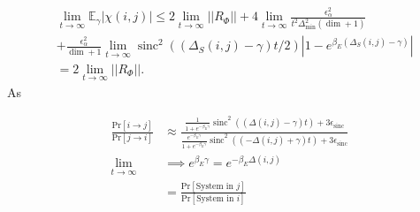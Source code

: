 \documentclass{article}
\newcommand{\abs}[1]{\left| #1 \right|}
\newcommand{\norm}[1]{\left| \left| #1 \right| \right|}
\newcommand{\prob}[1]{\text{Pr}\left[ #1 \right]}
\DeclareMathOperator{\sinc}{sinc}
\begin{document}
\begin{align}
    &\lim_{t \to \infty} \mathbb{E}_{\gamma} \abs{\chi(i,j)} \leq 2 \lim_{t \to \infty} \norm{R_{\Phi}} + 4 \lim_{t \to \infty} \frac{\epsilon_{\alpha}^2}{t^2 \Delta_{\min}^2 (\dim + 1)} \nonumber \\
    &+ \frac{\epsilon_{\alpha}^2}{\dim + 1} \lim_{t \to \infty} \sinc^2((\Delta_S(i,j) - \gamma)t/2) \abs{1 - e^{\beta_E(\Delta_S(i,j) - \gamma)}} \\
    &= 2 \lim_{t \to \infty} \norm{R_{\Phi}}.
\end{align}
As 

\begin{align}
    \frac{\prob{i \to j}}{\prob{j \to i}} &\approx \frac{\frac{1}{1 + e^{-\beta_E \gamma}}\sinc^2 ((\Delta(i,j) - \gamma)t)+ 3 \epsilon_{\sinc}}{\frac{e^{-\beta_E \gamma}}{1 + e^{-\beta_E \gamma}} \sinc^2((-\Delta(i,j) + \gamma)t) + 3 \epsilon_{\sinc}}  \nonumber \\
    \lim_{t \to \infty} &\implies e^{\beta_E \gamma} = e^{-\beta_E \Delta(i,j)} \nonumber \\
    &= \frac{\prob{\text{System in } j}}{ \prob{\text{System in } i}} \nonumber
\end{align}

\end{document}
